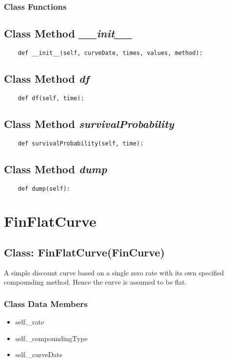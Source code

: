 \documentclass[twoside,11pt]{book}
\begin{document}
\subsubsection{Class Functions}

\subsection{Class Method {\it \_\_init\_\_}}


\begin{lstlisting}
    def __init__(self, curveDate, times, values, method):
\end{lstlisting}

\subsection{Class Method {\it df}}


\begin{lstlisting}
    def df(self, time):
\end{lstlisting}

\subsection{Class Method {\it survivalProbability}}


\begin{lstlisting}
    def survivalProbability(self, time):
\end{lstlisting}

\subsection{Class Method {\it dump}}


\begin{lstlisting}
    def dump(self):
\end{lstlisting}

\newpage
\section{FinFlatCurve}

\subsection{Class: FinFlatCurve(FinCurve)}
A simple discount curve based on a single zero rate with its own specified compounding method. Hence the curve is assumed to be flat. 

\subsubsection{Class Data Members}
\begin{itemize}
\item{self.\_rate}
\item{self.\_compoundingType}
\item{self.\_curveDate}
\end{itemize}
\end{document}
